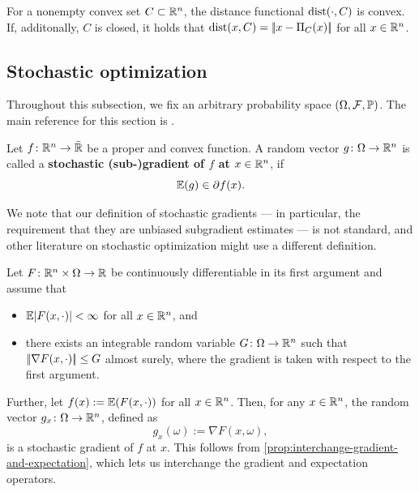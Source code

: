 \begin{proposition}
    \label{prop:distance-functional-is-convex}
    For a nonempty convex set $C\subset\mathbb{R}^n$, the distance functional $\operatorname{dist}(\cdot, C)$ is convex.
    If, additonally, $C$ is closed, it holds that $\operatorname{dist}(x, C) = |\!|x - \Pi_{C}(x)|\!|$ for all $x\in\mathbb{R}^n$.
\end{proposition}

\subsection{Stochastic optimization}

Throughout this subsection, we fix an arbitrary probability space $(\Omega, \mathcal{F}, \mathbb{P})$.
The main reference for this section is
\cite{duchi2018introductory}.

\begin{definition}
    Let $f\colon \mathbb{R}^n\to\bar{\mathbb{R}}$ be a proper and convex function.
    A random vector $g\colon\Omega\to\mathbb{R}^n$ is called a \textbf{stochastic (sub-)gradient of $f$
    at $x\in\mathbb{R}^n$}, if
    \[
        \mathbb{E}(g)\in\partial f(x).
    \]
\end{definition}

We note that our definition of stochastic gradients --- in particular, the requirement that
they are unbiased subgradient estimates ---
is not standard, and other literature on stochastic optimization might use a different definition.

\begin{example}
    \label{ex:stochastic-gradient}
    Let $F\colon \mathbb{R}^n\times\Omega\to\mathbb{R}$ be continuously differentiable in its first argument and
    assume that
    \begin{itemize}
        \item[-] $\mathbb{E}| F(x, \cdot) | < \infty$ for all $x\in\mathbb{R}^n$, and
        \item[-] there exists an integrable random variable $G\colon\Omega\to\mathbb{R}^n$
        such that $|\!| \nabla F(x, \cdot) |\!| \leq G$ almost surely, where the gradient is taken with respect to the first argument.
    \end{itemize} 
    Further, let $f(x) := \mathbb{E}(F(x, \cdot))$ for all $x\in\mathbb{R}^n$.
    Then, for any $x\in\mathbb{R}^n$, the random vector $g_x\colon \Omega\to\mathbb{R}^n$, defined as
    \[
        g_x(\omega) := \nabla F(x, \omega),
    \]
    is a stochastic gradient of $f$ at $x$.
    This follows from \cref{prop:interchange-gradient-and-expectation},
    which lets us interchange the gradient and expectation operators.
\end{example}

